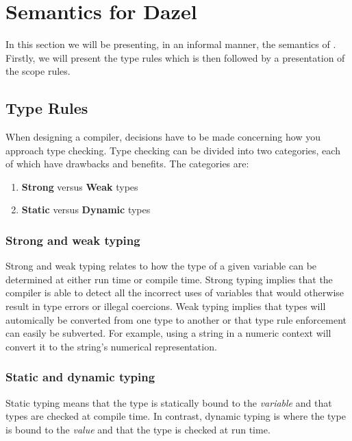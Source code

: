 \section{Semantics for Dazel} \label{sec:semantics}

In this section we will be presenting, in an informal manner, the semantics of \dazel{}.
Firstly, we will present the type rules which is then followed by a presentation of the scope rules.

\subsection{Type Rules}

When designing a compiler, decisions have to be made concerning how you approach type checking.
Type checking can be divided into two categories, each of which have drawbacks and benefits. The categories are:

\begin{enumerate}
    \item \textbf{Strong} versus \textbf{Weak} types
    \item \textbf{Static} versus \textbf{Dynamic} types
\end{enumerate}

\subsubsection*{Strong and weak typing}
Strong and weak typing relates to how the type of a given variable can be determined at either run time or compile time.
Strong typing implies that the compiler is able to detect all the incorrect uses of variables that would otherwise result in type errors or illegal coercions.
Weak typing implies that types will automically be converted from one type to another or that type rule enforcement can easily be subverted.
For example, using a string in a numeric context will convert it to the string's numerical representation\cite{sebesta_concepts_2016}.

\subsubsection*{Static and dynamic typing}
Static typing means that the type is statically bound to the \emph{variable} and that types are checked at compile time.
In contrast, dynamic typing is where the type is bound to the \emph{value} and that the type is checked at run time\cite{sebesta_concepts_2016}.\\

